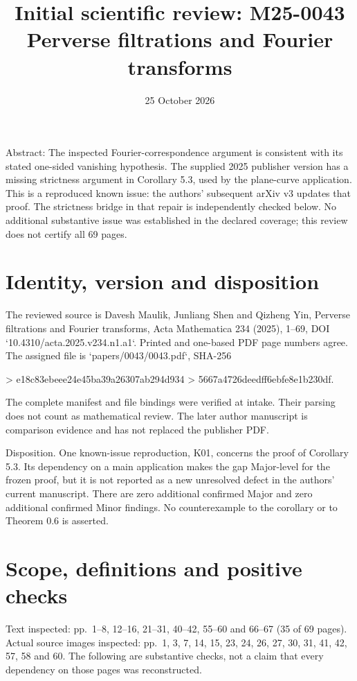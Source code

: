 \documentclass[10pt]{article}
\title{Initial scientific review: M25-0043
Perverse filtrations and Fourier transforms}
\author{}
\date{25 October 2026}
\begin{document}
\maketitle
Abstract: The inspected Fourier-correspondence argument is consistent with its stated one-sided vanishing hypothesis. The supplied 2025 publisher version has a missing strictness argument in Corollary 5.3, used by the plane-curve application. This is a reproduced known issue: the authors’ subsequent arXiv v3 updates that proof. The strictness bridge in that repair is independently checked below. No additional substantive issue was established in the declared coverage; this review does not certify all 69 pages.\par
\section*{Identity, version and disposition}
The reviewed source is Davesh Maulik, Junliang Shen and Qizheng Yin, Perverse filtrations and Fourier transforms, Acta Mathematica 234 (2025), 1–69, DOI `10.4310/acta.2025.v234.n1.a1`. Printed and one-based PDF page numbers agree. The assigned file is `papers/0043/0043.pdf`, SHA-256\par
> e18c83ebeee24e45ba39a26307ab294d934
> 5667a4726deedff6ebfe8e1b230df.\par
The complete manifest and file bindings were verified at intake. Their parsing does not count as mathematical review. The later author manuscript is comparison evidence and has not replaced the publisher PDF.\par
Disposition. One known-issue reproduction, K01, concerns the proof of Corollary 5.3. Its dependency on a main application makes the gap Major-level for the frozen proof, but it is not reported as a new unresolved defect in the authors’ current manuscript. There are zero additional confirmed Major and zero additional confirmed Minor findings. No counterexample to the corollary or to Theorem 0.6 is asserted.\par
\section*{Scope, definitions and positive checks}
Text inspected: pp. 1–8, 12–16, 21–31, 40–42, 55–60 and 66–67 (35 of 69 pages). Actual source images inspected: pp. 1, 3, 7, 14, 15, 23, 24, 26, 27, 30, 31, 41, 42, 57, 58 and 60. The following are substantive checks, not a claim that every dependency on those pages was reconstructed.\par
\end{document}
